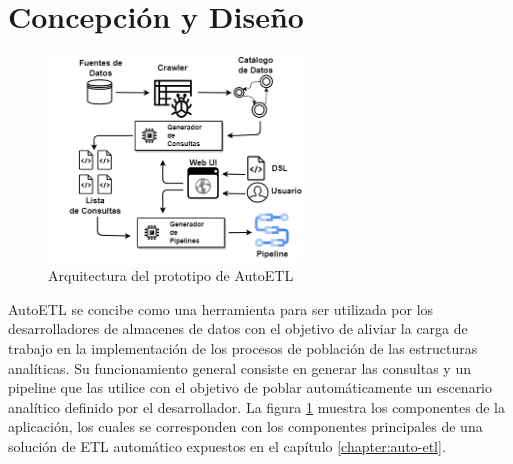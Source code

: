 \section{Concepción y Diseño}\label{section:design}

\begin{figure}
    \centering
    \includegraphics[width=0.60\textwidth]{Graphics/arch.drawio.png}
    \caption{Arquitectura del prototipo de AutoETL}
    \label{fig:arquitectura}
    \end{figure}

AutoETL se concibe como una herramienta para ser utilizada por los desarrolladores de almacenes de datos 
con el objetivo de aliviar la carga de trabajo en la implementación de los procesos de población de las 
estructuras analíticas. Su funcionamiento general consiste en generar las consultas y un pipeline que las utilice 
con el objetivo de poblar automáticamente un escenario analítico definido por el desarrollador. La 
figura \ref{fig:arquitectura} muestra los componentes de la aplicación, los cuales se corresponden 
con los componentes principales de una soluci\'on de ETL automático expuestos en el cap\'itulo \ref{chapter:auto-etl}.

